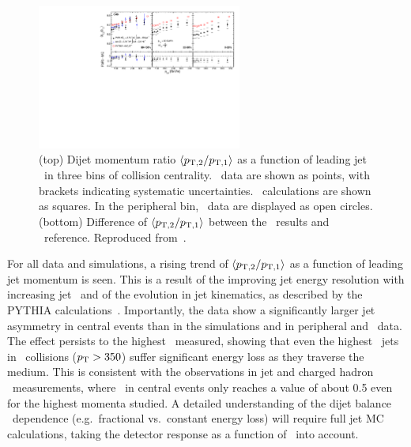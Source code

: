 \begin{figure}[!th]
\begin{center}
\includegraphics[width=0.6\textwidth]{jetfigures/deltaPtOverPt5_lead120_sub30_diff_20120103.pdf}
\caption{(top) Dijet momentum ratio $\langle p_{\rm{T},2}/p_{\rm{T},1} \rangle$ as a function of
leading jet \pT\ in three bins of collision centrality.
\PbPb\ data are shown as points, with brackets indicating systematic uncertainties.
\PYTHYD\ calculations are shown as squares. In the peripheral bin,
\pp\ data are displayed as open circles.
(bottom) Difference of $\langle p_{\rm{T},2}/p_{\rm{T},1} \rangle$ between the \PbPb\ results and \PYTHYD\ reference.
Reproduced from~\cite{CMS_dijet}.}
\label{fig:GR:CMS_pt_ratio}
\end{center}
\end{figure}

For all data and simulations, a rising trend of $\langle p_{\rm{T},2}/p_{\rm{T},1} \rangle$ as a function
of leading jet momentum is seen. This is a result of the improving jet energy resolution
with increasing jet \pT\ and of the evolution in jet kinematics, as described by the PYTHIA
calculations~\cite{CMS_dijet}. Importantly, the data show a significantly larger jet asymmetry in central events
than in the simulations and in peripheral and \pp\ data. The effect persists to the
highest \pT\ measured, showing that even the highest \pT\ jets in \PbPb\ collisions ($\mbox{$p_{\mathrm{T}}$} > 350$\GeVc)
suffer significant energy loss as they traverse the medium. This is consistent with the
observations in jet and charged hadron \Raa\ measurements, where \Raa\ in central events
only reaches a value of about 0.5 even for the highest momenta studied.
A detailed understanding of the dijet balance
\pT\ dependence (e.g.\ fractional vs.\ constant energy loss) will require full jet MC calculations,
taking the detector response as a function of \pT\ into account.

